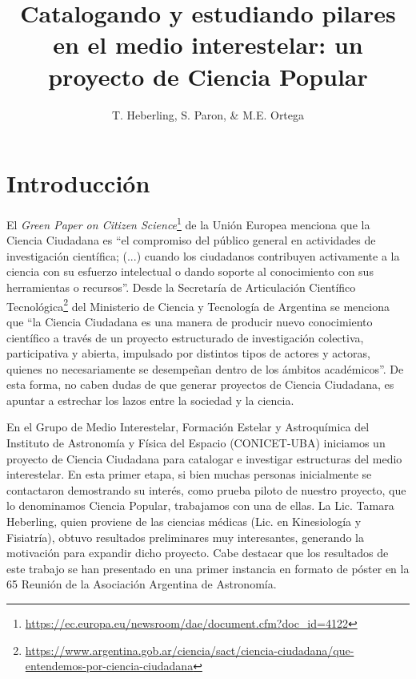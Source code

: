 \documentclass[baaa]{baaa}
\title{Catalogando y estudiando pilares en el medio interestelar: un proyecto
de Ciencia Popular}
\author{T. Heberling\inst{1},
S. Paron\inst{1},
\& M.E. Ortega\inst{1}
}
\institute{
Instituto de Astronomía y Física del Espacio, CONICET--UBA, Argentina
}
\begin{document}
\maketitle

\section{Introducción}

El {\it Green Paper on Citizen Science}\footnote{\url{https://ec.europa.eu/newsroom/dae/document.cfm?doc\_id=4122}} de la Unión Europea menciona que la Ciencia Ciudadana es ``el compromiso del público general en actividades de investigación científica; (...) cuando los ciudadanos contribuyen activamente a la ciencia con su esfuerzo intelectual o dando soporte al conocimiento con sus herramientas o recursos''. 
Desde la Secretaría de Articulación Científico Tecnológica\footnote{\url{https://www.argentina.gob.ar/ciencia/sact/ciencia-ciudadana/que-entendemos-por-ciencia-ciudadana}} del Ministerio de Ciencia y Tecnología de Argentina se menciona que ``la Ciencia Ciudadana es una manera de producir nuevo conocimiento científico a través de un proyecto estructurado de investigación colectiva, participativa y abierta, impulsado por distintos tipos de actores y actoras, quienes no necesariamente se desempeñan dentro de los ámbitos académicos''. De esta forma, no caben dudas de que generar proyectos de Ciencia Ciudadana, es apuntar a estrechar los lazos entre la sociedad y la ciencia.

En el Grupo de Medio Interestelar, Formación Estelar y Astroquímica del Instituto de Astronomía y Física del Espacio (CONICET-UBA) iniciamos un proyecto de Ciencia Ciudadana para catalogar e investigar estructuras del medio interestelar. En esta primer etapa, si bien muchas personas inicialmente se contactaron demostrando su interés, como prueba piloto de nuestro proyecto, que lo denominamos Ciencia Popular, trabajamos con una de ellas. La Lic. Tamara Heberling, quien proviene de las ciencias médicas (Lic. en Kinesiología y Fisiatría), obtuvo resultados preliminares muy interesantes, generando la motivación para expandir dicho proyecto.
Cabe destacar que los resultados de este trabajo se han presentado en
una primer instancia en formato de póster en la 65 Reunión de la Asociación Argentina de Astronomía.
\end{document}

